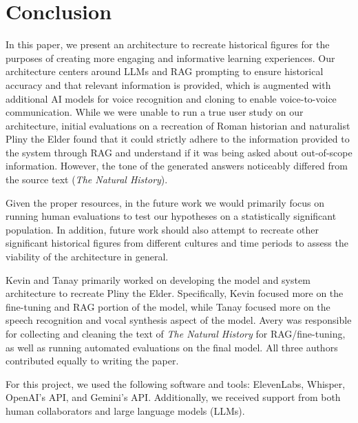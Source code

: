 \documentclass[sigconf]{aamas}
\begin{document}
\section{Conclusion}

In this paper, we present an architecture to recreate historical figures for the purposes of creating more engaging and informative learning experiences. Our architecture centers around LLMs and RAG prompting to ensure historical accuracy and that relevant information is provided, which is augmented with additional AI models for voice recognition and cloning to enable voice-to-voice communication. While we were unable to run a true user study on our architecture, initial evaluations on a recreation of Roman historian and naturalist Pliny the Elder found that it could strictly adhere to the information provided to the system through RAG and understand if it was being asked about out-of-scope information. However, the tone of the generated answers noticeably differed from the source text (\textit{The Natural History}).

Given the proper resources, in the future work we would primarily focus on running human evaluations to test our hypotheses on a statistically significant population. In addition, future work should also attempt to recreate other significant historical figures from different cultures and time periods to assess the viability of the architecture in general.



\begin{acks}
Kevin and Tanay primarily worked on developing the model and system architecture to recreate Pliny the Elder. Specifically, Kevin focused more on the fine-tuning and RAG portion of the model, while Tanay focused more on the speech recognition and vocal synthesis aspect of the model. Avery was responsible for collecting and cleaning the text of \textit{The Natural History} for RAG/fine-tuning, as well as running automated evaluations on the final model. All three authors contributed equally to writing the paper.

For this project, we used the following software and tools: ElevenLabs, Whisper, OpenAI's API, and Gemini's API. Additionally, we received support from both human collaborators and large language models (LLMs).
\end{acks}
\end{document}
